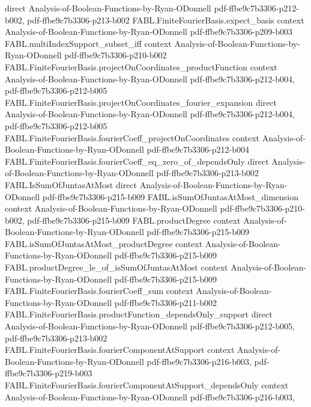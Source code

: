 \begin{theorem}
  {direct}
  {Analysis-of-Boolean-Functions-by-Ryan-ODonnell}
  {pdf-ffbe9c7b3306-p212-b002,
    pdf-ffbe9c7b3306-p213-b002}
\proofstep
  {FABL.FiniteFourierBasis.expect_basis}
  {context}
  {Analysis-of-Boolean-Functions-by-Ryan-ODonnell}
  {pdf-ffbe9c7b3306-p209-b003}
\proofstep
  {FABL.multiIndexSupport_subset_iff}
  {context}
  {Analysis-of-Boolean-Functions-by-Ryan-ODonnell}
  {pdf-ffbe9c7b3306-p210-b002}
\proofstep
  {FABL.FiniteFourierBasis.projectOnCoordinates_productFunction}
  {context}
  {Analysis-of-Boolean-Functions-by-Ryan-ODonnell}
  {pdf-ffbe9c7b3306-p212-b004,
    pdf-ffbe9c7b3306-p212-b005}
\proofstep
  {FABL.FiniteFourierBasis.projectOnCoordinates_fourier_expansion}
  {direct}
  {Analysis-of-Boolean-Functions-by-Ryan-ODonnell}
  {pdf-ffbe9c7b3306-p212-b004,
    pdf-ffbe9c7b3306-p212-b005}
\proofstep
  {FABL.FiniteFourierBasis.fourierCoeff_projectOnCoordinates}
  {context}
  {Analysis-of-Boolean-Functions-by-Ryan-ODonnell}
  {pdf-ffbe9c7b3306-p212-b004}
\proofstep
  {FABL.FiniteFourierBasis.fourierCoeff_eq_zero_of_dependsOnly}
  {direct}
  {Analysis-of-Boolean-Functions-by-Ryan-ODonnell}
  {pdf-ffbe9c7b3306-p213-b002}
\proofstep
  {FABL.IsSumOfJuntasAtMost}
  {direct}
  {Analysis-of-Boolean-Functions-by-Ryan-ODonnell}
  {pdf-ffbe9c7b3306-p215-b009}
\proofstep
  {FABL.isSumOfJuntasAtMost_dimension}
  {context}
  {Analysis-of-Boolean-Functions-by-Ryan-ODonnell}
  {pdf-ffbe9c7b3306-p210-b002,
    pdf-ffbe9c7b3306-p215-b009}
\proofstep
  {FABL.productDegree}
  {context}
  {Analysis-of-Boolean-Functions-by-Ryan-ODonnell}
  {pdf-ffbe9c7b3306-p215-b009}
\proofstep
  {FABL.isSumOfJuntasAtMost_productDegree}
  {context}
  {Analysis-of-Boolean-Functions-by-Ryan-ODonnell}
  {pdf-ffbe9c7b3306-p215-b009}
\proofstep
  {FABL.productDegree_le_of_isSumOfJuntasAtMost}
  {context}
  {Analysis-of-Boolean-Functions-by-Ryan-ODonnell}
  {pdf-ffbe9c7b3306-p215-b009}
\proofstep
  {FABL.FiniteFourierBasis.fourierCoeff_sum}
  {context}
  {Analysis-of-Boolean-Functions-by-Ryan-ODonnell}
  {pdf-ffbe9c7b3306-p211-b002}
\proofstep
  {FABL.FiniteFourierBasis.productFunction_dependsOnly_support}
  {direct}
  {Analysis-of-Boolean-Functions-by-Ryan-ODonnell}
  {pdf-ffbe9c7b3306-p212-b005,
    pdf-ffbe9c7b3306-p213-b002}
\proofstep
  {FABL.FiniteFourierBasis.fourierComponentAtSupport}
  {context}
  {Analysis-of-Boolean-Functions-by-Ryan-ODonnell}
  {pdf-ffbe9c7b3306-p216-b003,
    pdf-ffbe9c7b3306-p219-b003}
\proofstep
  {FABL.FiniteFourierBasis.fourierComponentAtSupport_dependsOnly}
  {context}
  {Analysis-of-Boolean-Functions-by-Ryan-ODonnell}
  {pdf-ffbe9c7b3306-p216-b003,
}
\end{theorem}
